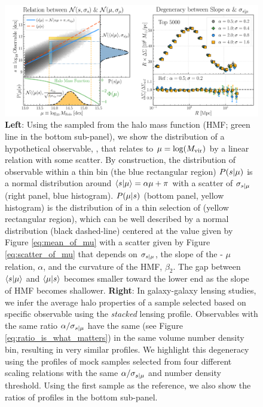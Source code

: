\documentclass[fleqn,usenatbib,useAMS,english]{mnras}
\begin{document}
    \begin{figure}
    \includegraphics[width=\textwidth]{figure/topn_fig_2}
    \caption{
        \textbf{Left}:
            Using the \mhalo{} sampled from the  halo mass function (HMF; green line in the
            bottom sub-panel), we show the distribution of a hypothetical observable, \obsSym{}, that
            relates to $\mu = \log(M_{\rm vir})$ by a linear relation with some scatter.
            By construction, the distribution of observable within a thin \mhalo{} bin (the blue
            rectangular region) $P(s | \mu)$ is a normal distribution around
            $\langle s | \mu \rangle = \alpha \mu + \pi$ with a scatter of
            $\sigma_{s | \mu}$(right panel, blue histogram).
            $P(\mu | s)$ (bottom panel, yellow histogram) is the distribution of \mhalo{} in
            a thin selection of \obsSym{} (yellow rectangular region), which can be well
            described by a normal distribution (black dashed-line) centered at the value given by
            Figure \ref{eq:mean_of_mu} with a scatter given by Figure \ref{eq:scatter_of_mu} that
            depends on $\sigma_{s | \mu}$, the slope of the \obsSym - $\mu$ relation, $\alpha$,
            and the curvature of the HMF, $\beta_2$.
            The gap between $\langle s | \mu \rangle$ and $\langle \mu | s \rangle$
            becomes smaller toward the lower \mhalo{} end as the slope of HMF becomes shallower.
        \textbf{Right}:
            In galaxy-galaxy lensing studies, we infer the average halo properties of a sample
            selected based on specific observable using the \emph{stacked} lensing profile.
            Observables with the same ratio $\alpha / \sigma_{s{} | \mu{}}$ have the same
            \scatterMhaloObsSym{} (see Figure \ref{eq:ratio_is_what_matters}) in the same volume
            number density bin, resulting in very similar \dsigma{} profiles.
            We highlight this degeneracy using the \rdsigma{} profiles of mock samples selected from
            four different scaling relations with the same $\alpha / \sigma_{s{} | \mu{}}$ and number
            density threshold.
            Using the first sample as the reference, we also show the ratios of \rdsigma{} profiles
            in the bottom sub-panel.
        }
        \label{fig:theory_2}
    \end{figure}
\end{document}
